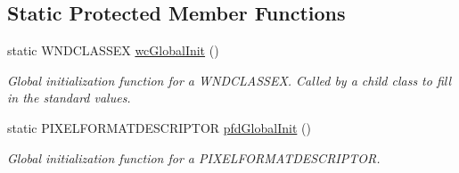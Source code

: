 \subsection*{Static Protected Member Functions}
\begin{DoxyCompactItemize}
\item 
static WNDCLASSEX \hyperlink{class_mosaic_base_a62557155e7252d0013d6488c070d01e8}{wcGlobalInit} ()
\begin{DoxyCompactList}\small\item\em Global initialization function for a WNDCLASSEX. Called by a child class to fill in the standard values. \end{DoxyCompactList}\item 
static PIXELFORMATDESCRIPTOR \hyperlink{class_mosaic_base_a146c275a444860c2047e8fef2f2bd129}{pfdGlobalInit} ()
\begin{DoxyCompactList}\small\item\em Global initialization function for a PIXELFORMATDESCRIPTOR. \end{DoxyCompactList}\end{DoxyCompactItemize}
